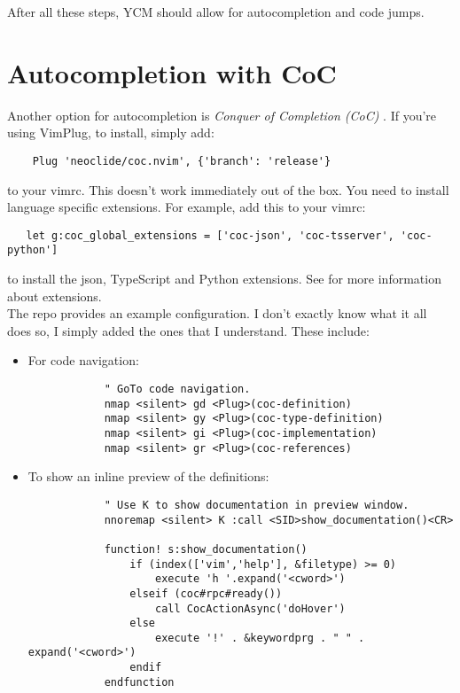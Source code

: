 After all these steps, YCM should allow for autocompletion and code jumps.

\section{Autocompletion with CoC}
Another option for autocompletion is \emph{Conquer of Completion (CoC)}
\cite{neoclide2020conquer}. If you're using VimPlug, to install, simply add:
\begin{lstlisting}
    Plug 'neoclide/coc.nvim', {'branch': 'release'}
\end{lstlisting}
to your vimrc. This doesn't work immediately out of the box. You need to install
language specific extensions. For example, add this to your vimrc:
\begin{lstlisting}
   let g:coc_global_extensions = ['coc-json', 'coc-tsserver', 'coc-python']
\end{lstlisting}
to install the json, TypeScript and Python extensions. See
\cite{neoclide2020extensions} for more information about extensions.\\

The repo \cite{neoclide2020conquer} provides an example configuration. I don't
exactly know what it all does so, I simply added the ones that I understand.
These include:
\begin{itemize}
    \item For code navigation:
        \begin{lstlisting}
            " GoTo code navigation.
            nmap <silent> gd <Plug>(coc-definition)
            nmap <silent> gy <Plug>(coc-type-definition)
            nmap <silent> gi <Plug>(coc-implementation)
            nmap <silent> gr <Plug>(coc-references)
        \end{lstlisting}
    \item To show an inline preview of the definitions:
        \begin{lstlisting}
            " Use K to show documentation in preview window.
            nnoremap <silent> K :call <SID>show_documentation()<CR>

            function! s:show_documentation()
                if (index(['vim','help'], &filetype) >= 0)
                    execute 'h '.expand('<cword>')
                elseif (coc#rpc#ready())
                    call CocActionAsync('doHover')
                else
                    execute '!' . &keywordprg . " " . expand('<cword>')
                endif
            endfunction
        \end{lstlisting}
\end{itemize}

